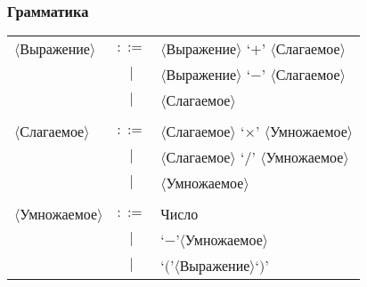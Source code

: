 \documentclass[pdf,russian]{beamer}
\begin{document}
\begin{frame}
    \frametitle{Грамматика}
    \pause
    \begin{tabular}{lcl}
        $\langle$Выражение$\rangle$  & $::=$ & $\langle$Выражение$\rangle$ `$+$' $\langle$Слагаемое$\rangle$ \\
                                     & $ | $ & $\langle$Выражение$\rangle$ `$-$' $\langle$Слагаемое$\rangle$ \\
                                     & $ | $ & $\langle$Слагаемое$\rangle$ \\ \\
        \pause
        $\langle$Слагаемое$\rangle$  & $::=$ & $\langle$Слагаемое$\rangle$ `$\times$' $\langle$Умножаемое$\rangle$ \\
                                     & $ | $ & $\langle$Слагаемое$\rangle$ `$/$' $\langle$Умножаемое$\rangle$ \\
                                     & $ | $ & $\langle$Умножаемое$\rangle$ \\ \\
        \pause
        $\langle$Умножаемое$\rangle$ & $::=$ & Число \\
                                     & $ | $ & `$-$'$\langle$Умножаемое$\rangle$ \\
                                     & $ | $ & `$($'$\langle$Выражение$\rangle$`$)$'
    \end{tabular}
\end{frame}
\end{document}
